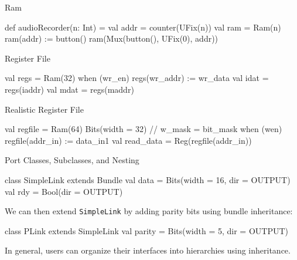 \documentclass[xcolor=pdflatex,dvipsnames,table]{beamer}
\begin{document}
\begin{frame}[fragile]{Ram}

\begin{scala}
def audioRecorder(n: Int) = { 
  val addr   = counter(UFix(n))
  val ram    = Ram(n)
  ram(addr) := button()
  ram(Mux(button(), UFix(0), addr))
} 
\end{scala}

\end{frame}

\begin{frame}[fragile]{Register File}

\begin{scala}
val regs = Ram(32)
when (wr_en) {
 regs(wr_addr) := wr_data
}
val idat = regs(iaddr)
val mdat = regs(maddr)
\end{scala}

\end{frame}

\begin{frame}[fragile]{Realistic Register File}

\begin{scala}
val regfile = Ram(64){ Bits(width = 32) }
// w_mask = bit_mask
when (wen) {
  regfile(addr_in) := data_in1
}
val read_data = Reg(regfile(addr_in))
\end{scala}

\end{frame}

\begin{frame}[fragile]{Port Classes, Subclasses, and Nesting}

\begin{scala}
class SimpleLink extends Bundle { 
  val data = Bits(width = 16, dir = OUTPUT) 
  val rdy  = Bool(dir = OUTPUT)
}
\end{scala}

\noindent
We can then extend \verb+SimpleLink+ by adding parity bits using
bundle inheritance:

\begin{scala}
class PLink extends SimpleLink { 
  val parity = Bits(width = 5, dir = OUTPUT) 
}
\end{scala}

\noindent
In general, users can organize their interfaces into hierarchies using inheritance.  

\end{frame}
\end{document}
